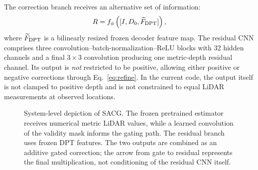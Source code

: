 The correction branch receives an alternative set of information:
\begin{equation}
R=f_\phi\left([I,D_0,\widetilde F_{\rm DPT}]\right),
\label{eq:residual}
\end{equation}
where $\widetilde F_{\rm DPT}$ is a bilinearly resized frozen decoder feature map. The residual CNN comprises three convolution--batch-normalization--ReLU blocks with 32 hidden channels and a final $3\times3$ convolution producing one metric-depth residual channel. Its output is \emph{not} restricted to be positive, allowing either positive or negative corrections through Eq.~\eqref{eq:refine}. In the current code, the output itself is not clamped to positive depth and is not constrained to equal LiDAR measurements at observed locations.

\begin{figure}[t]
\centering
{}
\caption{System-level depiction of SACG. The frozen pretrained estimator receives numerical metric LiDAR values, while a learned convolution of the validity mask informs the gating path. The residual branch uses frozen DPT features. The two outputs are combined as an additive gated correction; the arrow from gate to residual represents the final multiplication, not conditioning of the residual CNN itself.}
\label{fig:architecture}
\end{figure}

